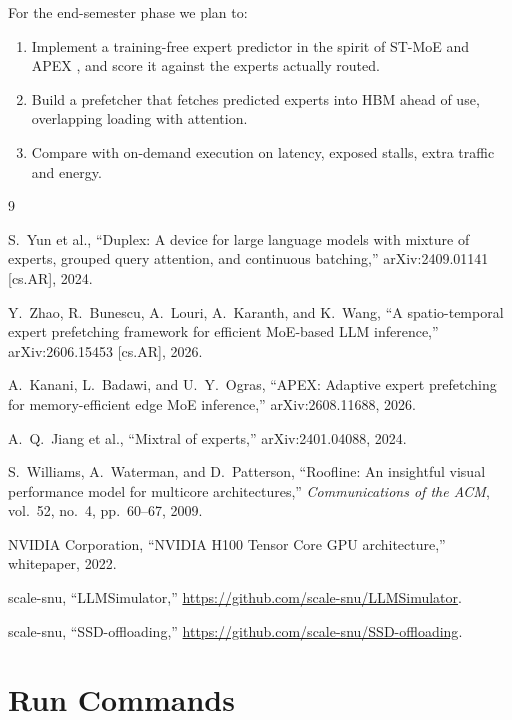 \documentclass[11pt,a4paper]{report}
\begin{document}
For the end-semester phase we plan to:
\begin{enumerate}
\item Implement a training-free expert predictor in the spirit of ST-MoE \cite{stmoe} and APEX \cite{apex}, and score it against the experts actually routed.
\item Build a prefetcher that fetches predicted experts into HBM ahead of use, overlapping loading with attention.
\item Compare with on-demand execution on latency, exposed stalls, extra traffic and energy.
\end{enumerate}

\begin{thebibliography}{9}

S.~Yun et al., ``Duplex: A device for large language models with mixture of experts, grouped query attention, and continuous batching,'' arXiv:2409.01141 [cs.AR], 2024.

Y.~Zhao, R.~Bunescu, A.~Louri, A.~Karanth, and K.~Wang, ``A spatio-temporal expert prefetching framework for efficient MoE-based LLM inference,'' arXiv:2606.15453 [cs.AR], 2026.

A.~Kanani, L.~Badawi, and U.~Y.~Ogras, ``APEX: Adaptive expert prefetching for memory-efficient edge MoE inference,'' arXiv:2608.11688, 2026.

A.~Q.~Jiang et al., ``Mixtral of experts,'' arXiv:2401.04088, 2024.

S.~Williams, A.~Waterman, and D.~Patterson, ``Roofline: An insightful visual performance model for multicore architectures,'' \textit{Communications of the ACM}, vol.~52, no.~4, pp.~60--67, 2009.

NVIDIA Corporation, ``NVIDIA H100 Tensor Core GPU architecture,'' whitepaper, 2022.

scale-snu, ``LLMSimulator,'' \url{https://github.com/scale-snu/LLMSimulator}.

scale-snu, ``SSD-offloading,'' \url{https://github.com/scale-snu/SSD-offloading}.

\end{thebibliography}

\appendix

\chapter{Run Commands}
\label{app:cmds}
\end{document}
